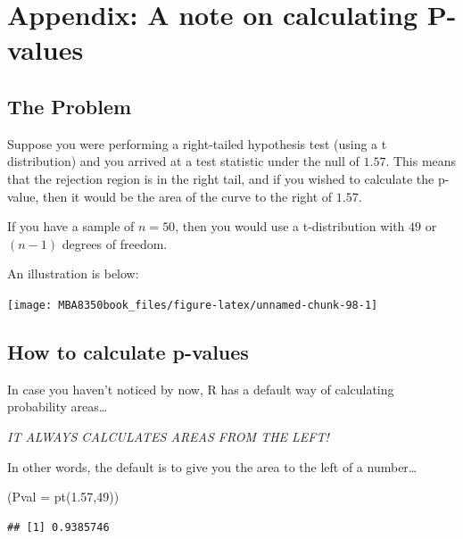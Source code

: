 \documentclass[
]{book}
\newenvironment{Shaded}{\begin{snugshade}}{\end{snugshade}}
\newcommand{\AttributeTok}[1]{\textcolor[rgb]{0.77,0.63,0.00}{#1}}
\newcommand{\DecValTok}[1]{\textcolor[rgb]{0.00,0.00,0.81}{#1}}
\newcommand{\FloatTok}[1]{\textcolor[rgb]{0.00,0.00,0.81}{#1}}
\newcommand{\FunctionTok}[1]{\textcolor[rgb]{0.00,0.00,0.00}{#1}}
\newcommand{\NormalTok}[1]{#1}
\begin{document}
\hypertarget{appendix-a-note-on-calculating-p-values}{%
\section{Appendix: A note on calculating P-values}\label{appendix-a-note-on-calculating-p-values}}

\hypertarget{the-problem}{%
\subsection{The Problem}\label{the-problem}}

Suppose you were performing a right-tailed hypothesis test (using a t distribution) and you arrived at a test statistic under the null of \(1.57\). This means that the rejection region is in the right tail, and if you wished to calculate the p-value, then it would be the area of the curve to the right of \(1.57\).

If you have a sample of \(n = 50\), then you would use a t-distribution with \(49\) or \((n-1)\) degrees of freedom.

An illustration is below:

\begin{center}\texttt{[image: MBA8350book\_files/figure-latex/unnamed-chunk-98-1]} \end{center}

\hypertarget{how-to-calculate-p-values}{%
\subsection{How to calculate p-values}\label{how-to-calculate-p-values}}

In case you haven't noticed by now, R has a default way of calculating probability areas\ldots{}

\emph{IT ALWAYS CALCULATES AREAS FROM THE LEFT!}

In other words, the default is to give you the area to the left of a number\ldots{}

\begin{Shaded}
\begin{Highlighting}[]
\NormalTok{(}\AttributeTok{Pval =} \FunctionTok{pt}\NormalTok{(}\FloatTok{1.57}\NormalTok{,}\DecValTok{49}\NormalTok{))}
\end{Highlighting}
\end{Shaded}

\begin{verbatim}
## [1] 0.9385746
\end{verbatim}
\end{document}
